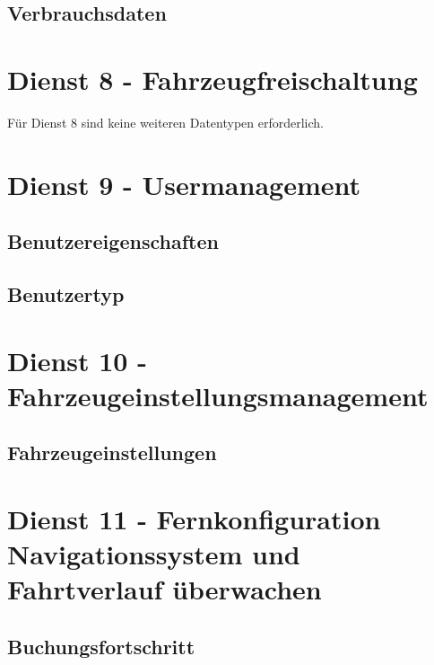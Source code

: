\subsection*{Verbrauchsdaten}



\section{Dienst 8 - Fahrzeugfreischaltung}
\label{sec:Datenmodell:Dienst8}
Für Dienst 8 sind keine weiteren Datentypen erforderlich.

\section{Dienst 9 - Usermanagement}
\label{sec:Datenmodell:Dienst9}

\subsection*{Benutzereigenschaften}



\subsection*{Benutzertyp}



\section{Dienst 10 - Fahrzeugeinstellungsmanagement}
\label{sec:Datenmodell:Dienst10}

\subsection*{Fahrzeugeinstellungen}



\section{Dienst 11 - Fernkonfiguration Navigationssystem und Fahrtverlauf überwachen}
\label{sec:Datenmodell:Dienst11}

\subsection*{Buchungsfortschritt}



